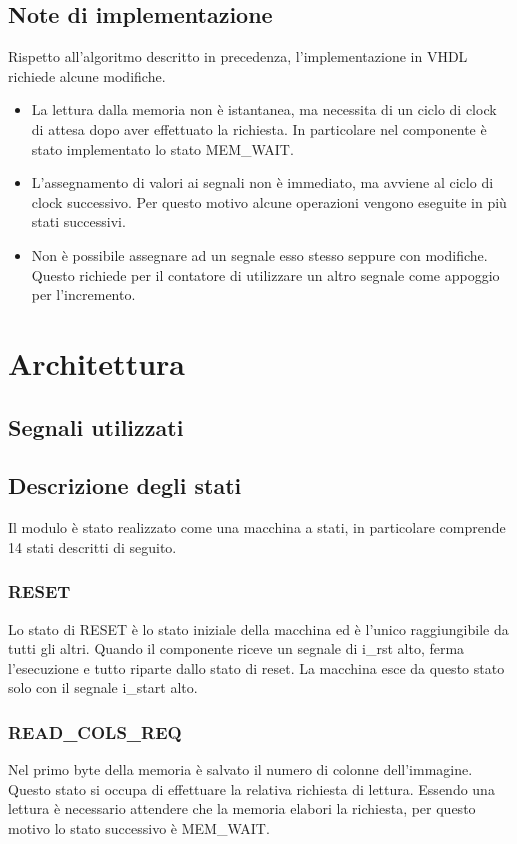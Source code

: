 \documentclass{article}
\begin{document}
\subsection{Note di implementazione}
Rispetto all'algoritmo descritto in precedenza, l'implementazione in VHDL richiede alcune modifiche.
\begin{itemize}
    \item La lettura dalla memoria non è istantanea, ma necessita di un ciclo di clock di attesa dopo aver effettuato la richiesta. In particolare nel componente è stato implementato lo stato MEM\_WAIT.
    \item L'assegnamento di valori ai segnali non è immediato, ma avviene al ciclo di clock successivo. Per questo motivo alcune operazioni vengono eseguite in più stati successivi.
    \item Non è possibile assegnare ad un segnale esso stesso seppure con modifiche. Questo richiede per il contatore di utilizzare un altro segnale come appoggio per l'incremento.
\end{itemize}

\pagebreak
{}
\section{Architettura}

\subsection{Segnali utilizzati}

\pagebreak
\subsection{Descrizione degli stati}
Il modulo è stato realizzato come una macchina a stati, in particolare comprende 14 stati descritti di seguito.

\subsubsection{RESET}
Lo stato di RESET è lo stato iniziale della macchina ed è l'unico raggiungibile da tutti gli altri. Quando il componente riceve un segnale di i\_rst alto, ferma l'esecuzione e tutto riparte dallo stato di reset. La macchina esce da questo stato solo con il segnale i\_start alto.

\subsubsection{READ\_COLS\_REQ}
Nel primo byte della memoria è salvato il numero di colonne dell'immagine. Questo stato si occupa di effettuare la relativa richiesta di lettura. Essendo una lettura è necessario attendere che la memoria elabori la richiesta, per questo motivo lo stato successivo è MEM\_WAIT.
\end{document}
